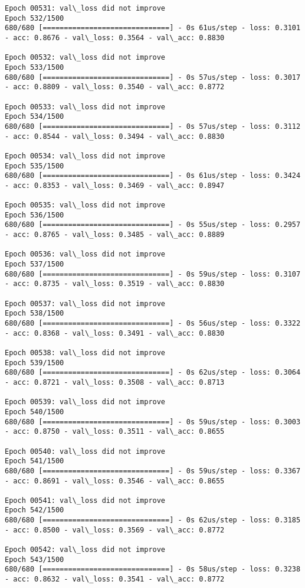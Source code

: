 \documentclass[11pt]{article}
\begin{document}
\begin{Verbatim}[commandchars=\\\{\}]
Epoch 00531: val\_loss did not improve
Epoch 532/1500
680/680 [==============================] - 0s 61us/step - loss: 0.3101 - acc: 0.8676 - val\_loss: 0.3564 - val\_acc: 0.8830

Epoch 00532: val\_loss did not improve
Epoch 533/1500
680/680 [==============================] - 0s 57us/step - loss: 0.3017 - acc: 0.8809 - val\_loss: 0.3540 - val\_acc: 0.8772

Epoch 00533: val\_loss did not improve
Epoch 534/1500
680/680 [==============================] - 0s 57us/step - loss: 0.3112 - acc: 0.8544 - val\_loss: 0.3494 - val\_acc: 0.8830

Epoch 00534: val\_loss did not improve
Epoch 535/1500
680/680 [==============================] - 0s 61us/step - loss: 0.3424 - acc: 0.8353 - val\_loss: 0.3469 - val\_acc: 0.8947

Epoch 00535: val\_loss did not improve
Epoch 536/1500
680/680 [==============================] - 0s 55us/step - loss: 0.2957 - acc: 0.8765 - val\_loss: 0.3485 - val\_acc: 0.8889

Epoch 00536: val\_loss did not improve
Epoch 537/1500
680/680 [==============================] - 0s 59us/step - loss: 0.3107 - acc: 0.8735 - val\_loss: 0.3519 - val\_acc: 0.8830

Epoch 00537: val\_loss did not improve
Epoch 538/1500
680/680 [==============================] - 0s 56us/step - loss: 0.3322 - acc: 0.8368 - val\_loss: 0.3491 - val\_acc: 0.8830

Epoch 00538: val\_loss did not improve
Epoch 539/1500
680/680 [==============================] - 0s 62us/step - loss: 0.3064 - acc: 0.8721 - val\_loss: 0.3508 - val\_acc: 0.8713

Epoch 00539: val\_loss did not improve
Epoch 540/1500
680/680 [==============================] - 0s 59us/step - loss: 0.3003 - acc: 0.8750 - val\_loss: 0.3511 - val\_acc: 0.8655

Epoch 00540: val\_loss did not improve
Epoch 541/1500
680/680 [==============================] - 0s 59us/step - loss: 0.3367 - acc: 0.8691 - val\_loss: 0.3546 - val\_acc: 0.8655

Epoch 00541: val\_loss did not improve
Epoch 542/1500
680/680 [==============================] - 0s 62us/step - loss: 0.3185 - acc: 0.8500 - val\_loss: 0.3569 - val\_acc: 0.8772

Epoch 00542: val\_loss did not improve
Epoch 543/1500
680/680 [==============================] - 0s 58us/step - loss: 0.3238 - acc: 0.8632 - val\_loss: 0.3541 - val\_acc: 0.8772


\end{Verbatim}
\end{document}
